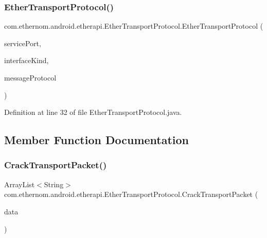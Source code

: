 \subsubsection{\texorpdfstring{Ether\+Transport\+Protocol()}{EtherTransportProtocol()}}
{\footnotesize\ttfamily com.\+ethernom.\+android.\+etherapi.\+Ether\+Transport\+Protocol.\+Ether\+Transport\+Protocol (\begin{DoxyParamCaption}\item[{byte}]{service\+Port,  }\item[{\mbox{\hyperlink{enumcom_1_1ethernom_1_1android_1_1etherapi_1_1link_layer_1_1_t_interface}{T\+Interface}}}]{interface\+Kind,  }\item[{\mbox{\hyperlink{enumcom_1_1ethernom_1_1android_1_1etherapi_1_1_t_message_protocol}{T\+Message\+Protocol}}}]{message\+Protocol }\end{DoxyParamCaption})}



Definition at line 32 of file Ether\+Transport\+Protocol.\+java.



\subsection{Member Function Documentation}
\mbox{\label{classcom_1_1ethernom_1_1android_1_1etherapi_1_1_ether_transport_protocol_ab653c54f20447fb1f71e55e56322b4f1}} 
\subsubsection{\texorpdfstring{Crack\+Transport\+Packet()}{CrackTransportPacket()}}
{\footnotesize\ttfamily Array\+List$<$String$>$ com.\+ethernom.\+android.\+etherapi.\+Ether\+Transport\+Protocol.\+Crack\+Transport\+Packet (\begin{DoxyParamCaption}\item[{byte \mbox{[}$\,$\mbox{]}}]{data }\end{DoxyParamCaption})\hspace{0.3cm}{\ttfamily [private]}}



